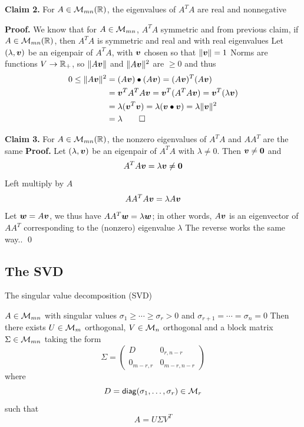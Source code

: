 \documentclass[aspectratio=169]{beamer}\usepackage[]{graphicx}\usepackage[]{xcolor}
\begin{document}
\begin{frame}
\textbf{Claim 2.} For $A\in\mathcal{M}_{mn}(\mathbb{R})$, the eigenvalues of $A^TA$ are real and nonnegative

\vfill
\textbf{Proof.}
We know that for $A\in\mathcal{M}_{mn}$, $A^TA$ symmetric and from previous claim, if $A\in\mathcal{M}_{mn}(\mathbb{R})$, then $A^TA$ is symmetric and real and with real eigenvalues
\vfill
Let $(\lambda,\bm{v})$ be an eigenpair of $A^TA$, with $\bm{v}$ chosen so that $\|\bm{v}\|=1$
\vfill 
Norms are functions $V\to\mathbb{R}_+$, so $\|A\bm{v}\|$ and $\|A\bm{v}\|^2$ are $\geq 0$ and thus
\begin{align*}
0\leq \|A\bv\|^2 &= (A\bv)\bullet(A\bv) = (A\bv)^T(A\bv) \\
&= \bv^TA^TA\bv = \bv^T(A^TA\bv) = \bv^T(\lambda\bv) \\
&= \lambda(\bv^T\bv) = \lambda(\bv\bullet\bv) = \lambda\|\bv\|^2 \\
&= \lambda\hfill\qed
\end{align*}
\end{frame}

\begin{frame}
\textbf{Claim 3.} For $A\in\mathcal{M}_{mn}(\mathbb{R})$, the nonzero eigenvalues of $A^TA$ and $AA^T$ are the same
\vfill
\textbf{Proof.}
Let $(\lambda,\bm{v})$ be an eigenpair of $A^TA$ with $\lambda\neq 0$. Then $\bv\neq\b0$ and
\[
	A^TA\bv=\lambda\bv\neq\b0
\]
Left multiply by $A$
\[
	AA^TA\bm{v} = \lambda A\bm{v}
\]
Let $\bm{w}=A\bm{v}$, we thus have $AA^T\bm{w}=\lambda\bm{w}$; in other words, $A\bm{v}$ is an eigenvector of $AA^T$ corresponding to the (nonzero) eigenvalue $\lambda$
\vfill
The reverse works the same way.. \qed
\end{frame}

\subsection{The SVD}

\begin{frame}{The singular value decomposition (SVD)}
\begin{importanttheorem}[SVD]\label{th:SVD}
$A\in\mathcal{M}_{mn}$ with singular values $\sigma_1\geq\cdots\geq\sigma_r>0$ and $\sigma_{r+1}=\cdots=\sigma_n=0$
\vskip0.5cm
Then there exists $U\in\mathcal{M}_m$ orthogonal, $V\in\mathcal{M}_n$ orthogonal and a block matrix $\Sigma\in\mathcal{M}_{mn}$ taking the form
\[
\Sigma=
\begin{pmatrix}
D & 0_{r,n-r} \\
0_{m-r,r} & 0_{m-r,n-r}
\end{pmatrix}
\]
where 
\[
D = \mathsf{diag}(\sigma_1,\ldots,\sigma_r)\in\mathcal{M}_r
\] 
such that
\[
A=U\Sigma V^T
\]
\end{importanttheorem}
\end{frame}
\end{document}
